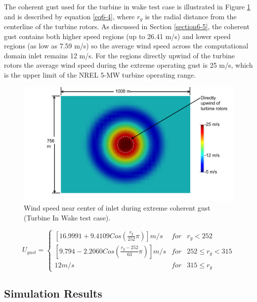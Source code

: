 The coherent gust used for the turbine in wake test case is illustrated in Figure \ref{fig6-26} and is described by equation \ref{eq6-4}, where $r_g$ is the radial distance from the centerline of the turbine rotors. As discussed in Section \ref{section6-5}, the coherent gust contains both higher speed regions (up to 26.41 m/s) and lower speed regions (as low as 7.59 m/s) so the average wind speed across the computational domain inlet remains 12 m/s. For the regions directly upwind of the turbine rotors the average wind speed during the extreme operating gust is 25 m/s, which is the upper limit of the NREL 5-MW turbine operating range. 

\begin{figure}[ht] 
	\centering
		\includegraphics[width = \linewidth]{Figures/ch6Figures/fig6-26.png}

	\caption{Wind speed near center of inlet during extreme coherent gust (Turbine In Wake test case).}
	\label{fig6-26} 
\end{figure}

\begin{equation} 
	U_{gust}=\left\{\begin{matrix}
\left [16.9991 +9.4109Cos\left ( \frac{r_g}{252 }\pi  \right )  \right ]m/s & for  & r_g<252\\ 
 \left [9.794 -2.2060Cos\left ( \frac{r_g-252}{63}\pi  \right )  \right ]m/s & for  & 252 \leq r_g <315\\ 
 12 m/s &  for & 315 \leq r_g
\end{matrix}\right. 
\label{eq6-4}
\end{equation}

\subsection{Simulation Results} \label{section6-7-2}

